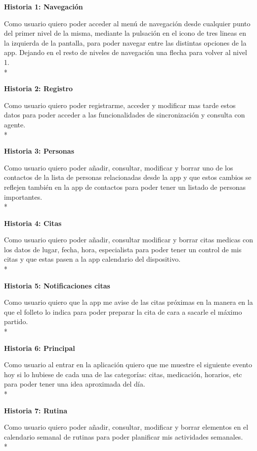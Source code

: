 \documentclass[../pfc.tex]{subfiles}
\begin{document}
	\textbf{Historia 1: Navegación}

		Como usuario quiero poder acceder al menú de navegación desde cualquier punto del primer nivel de la misma, mediante la pulsación en el icono de tres lineas en la izquierda de la pantalla, para poder navegar entre las distintas opciones de la app. Dejando en el resto de niveles de navegación una flecha para volver al nivel 1.\\*
		
		
	\textbf{Historia 2: Registro}
		
		Como usuario quiero poder registrarme, acceder y modificar mas tarde estos datos para poder acceder a las funcionalidades de sincronización y consulta con agente.\\*
	
	
	\textbf{Historia 3: Personas}
		
		Como usuario quiero poder añadir, consultar, modificar y borrar uno de los contactos de la lista de personas relacionadas desde la app y que estos cambios se reflejen también en la app de contactos para poder tener un listado de personas importantes.\\*


	\textbf{Historia 4: Citas}	
	
		Como usuario quiero poder añadir, consultar modificar y borrar citas medicas con los datos de lugar, fecha, hora, especialista para poder tener un control de mis citas y que estas pasen a la app calendario del dispositivo. \\*
		
		
	\textbf{Historia 5: Notificaciones citas}
		
		Como usuario quiero que la app me avise de las citas próximas en la manera en la que el folleto lo indica para poder preparar la cita de cara a sacarle el máximo partido.\\*
	
	
	\textbf{Historia 6: Principal}
	
		Como usuario al entrar en la aplicación quiero que me muestre el siguiente evento hoy si lo hubiese de cada una de las categorías: citas, medicación, horarios, etc para poder tener una idea aproximada del día.\\*
	
	
	\textbf{Historia 7: Rutina}
	
		Como usuario quiero poder añadir, consultar, modificar y borrar elementos en el calendario semanal de rutinas para poder planificar mis actividades semanales.\\*
	
\end{document}
